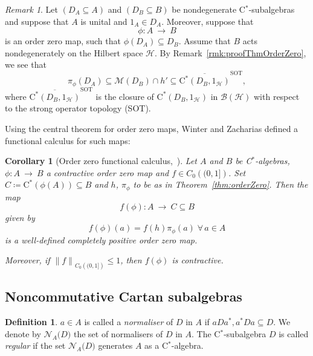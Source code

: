 \documentclass[a4paper]{amsart}
\newcommand{\myhyp}{\textnormal{-}\hskip0pt\relax}
\numberwithin{equation}{section}
\newcommand{\Bcal}{\mathcal{B}}
\newcommand{\Hcal}{\mathcal{H}}
\newcommand{\Mcal}{\mathcal{M}}
\newcommand{\contO}[1]{C_{0}({#1})}
\newcommand{\multAlg}[1]{\Mcal({#1})}
\newcommand{\cstar}{C$^\ast$\myhyp{}algebra}
\newcommand{\cstarSub}{C$^\ast$\myhyp{}subalgebra}
\newcommand{\calg}[1]{\mathrm{C}^\ast({#1})}
\newcommand{\bop}[1]{\Bcal({#1})}
\newcommand{\rAr}{\longrightarrow}
\newcommand{\normreg}[1]{{\lVert #1  \rVert}}
\newcommand{\normalisers}[2]{{\mathcal{N}}_{#2}{\big({#1}\big)}}
\theoremstyle{plain}
\newtheorem{cor}[thm]{Corollary}
\theoremstyle{indented}
\numberwithin{equation}{section}
\theoremstyle{definition}
\newtheorem{defin}[thm]{Definition}
\theoremstyle{remark}
\newtheorem{rmk}[thm]{Remark}
\theoremstyle{plain}
\theoremstyle{definition}
\begin{document}
\begin{rmk} \label{rmk:orderZeroSOT}
    Let ${(D_A \subseteq A)}$ and ${(D_B \subseteq B)}$ be nondegenerate \cstarSub{}s
    and
    suppose that
    $A$ is unital and ${1_A \in D_A}$.
    Moreover, suppose that 
    \[\phi \colon A~\rAr~B\] 
    is an order zero map, such that ${\phi(D_A) \subseteq D_B}$. 
    Assume that $B$ acts nondegenerately on the 
    Hilbert space $\Hcal$.
    By Remark~\ref{rmk:proofThmOrderZero},
    we see that
    \begin{equation*}
        \pi_{\phi} (D_A) \subseteq \multAlg{D_B} \cap h' 
        \subseteq \overline{\calg{D_B, 1_{\Hcal}}}^{\mathrm{SOT}},
    \end{equation*}
    where ${\overline{\calg{D_B, 1_{\Hcal}}}^{\mathrm{SOT}}}$ is the closure of ${\calg{D_B, 1_{\Hcal}}}$ in ${\bop{\Hcal}}$ with respect to the strong operator topology (SOT).
\end{rmk}

\smallskip

Using the central theorem for order zero maps, Winter and Zacharias defined a functional calculus for such maps: 

\begin{cor}[{Order zero functional calculus,~\cite[Corollary~3.2]{WinterZacharias2009orderZero}}] \label{cor:orderZeroCalc}
    Let $A$ and $B$ be \cstar{}s, ${\phi \colon A~\rAr~B}$ a contractive order zero map and ${f \in \contO{(0,1]}}$. 
    Set ${C \coloneq \calg{\phi(A)} \subseteq B}$ and $h$, $\pi_{\phi}$ to be as in Theorem~\textup{\ref{thm:orderZero}}. 
    Then the map
    \begin{equation*}
        f(\phi) \colon A~\rAr~C \subseteq B
    \end{equation*}
    given by 
    \begin{equation*}
        f(\phi)(a) = f(h) \pi_{\phi}(a)\; \forall \, a \in A
    \end{equation*}
    is a well\myhyp{}defined completely positive order zero map. 
    
    Moreover, if ${\normreg{f}_{\contO{(0,1]}} \le 1}$, then $f(\phi)$ is contractive.
\end{cor}


\medskip
\subsection{Noncommutative Cartan subalgebras}

\begin{defin}
     ${a \in A}$ is called a 
    \emph{normaliser} of $D$ in $A$
    if ${a D a^\ast, a^\ast D a \subseteq D}$.
    We denote by $\normalisers{D}{A}$ the set of normalisers of $D$ in $A$. 
    The \cstarSub{} $D$ is called \emph{regular} if the set $\normalisers{D}{A}$ generates $A$ as a \cstar{}.
\end{defin}
\end{document}
